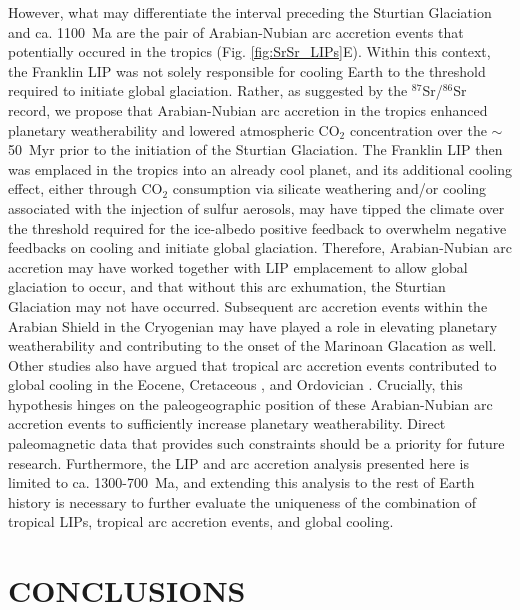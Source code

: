\documentclass[11pt,letterpaper]{article}
\newcommand{\SrSr}{$^{87}$Sr/$^{86}$Sr\xspace}
\begin{document}
However, what may differentiate the interval preceding the Sturtian Glaciation and ca. 1100~Ma are the pair of Arabian-Nubian arc accretion events that potentially occured in the tropics (Fig. \ref{fig:SrSr_LIPs}E). Within this context, the Franklin LIP was not solely responsible for cooling Earth to the threshold required to initiate global glaciation. Rather, as suggested by the \SrSr record, we propose that Arabian-Nubian arc accretion in the tropics enhanced planetary weatherability and lowered atmospheric CO$_{2}$ concentration over the $\sim$50~Myr prior to the initiation of the Sturtian Glaciation. The Franklin LIP then was emplaced in the tropics into an already cool planet, and its additional cooling effect, either through CO$_{2}$ consumption via silicate weathering and/or cooling associated with the injection of sulfur aerosols, may have tipped the climate over the threshold required for the ice-albedo positive feedback to overwhelm negative feedbacks on cooling and initiate global glaciation. Therefore, Arabian-Nubian arc accretion may have worked together with LIP emplacement to allow global glaciation to occur, and that without this arc exhumation, the Sturtian Glaciation may not have occurred. Subsequent arc accretion events within the Arabian Shield in the Cryogenian \citep{Johnson2014a} may have played a role in elevating planetary weatherability and contributing to the onset of the Marinoan Glacation as well. Other studies also have argued that tropical arc accretion events contributed to global cooling in the Eocene, Cretaceous \citep{Jagoutz2016a}, and Ordovician \citep{Swanson-Hysell2017a}. Crucially, this hypothesis hinges on the paleogeographic position of these Arabian-Nubian arc accretion events to sufficiently increase planetary weatherability. Direct paleomagnetic data that provides such constraints should be a priority for future research. Furthermore, the LIP and arc accretion analysis presented here is limited to ca. 1300-700~Ma, and extending this analysis to the rest of Earth history is necessary to further evaluate the uniqueness of the combination of tropical LIPs, tropical arc accretion events, and global cooling.

\section*{CONCLUSIONS \label{sec:CONCLUSIONS}}
\end{document}
